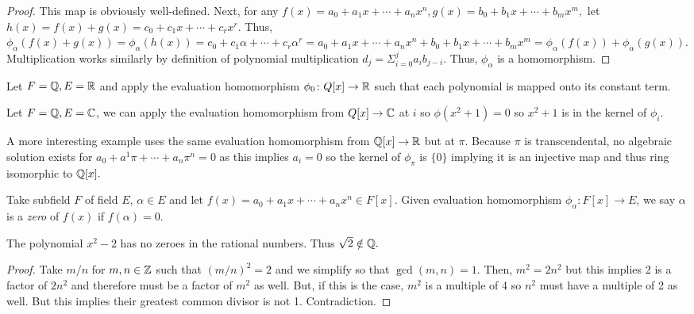 \begin{proof}
    This map is obviously well-defined. Next, for any $f(x) = a_0 + a_1x + \cdots + a_nx^n, g(x) = b_0 + b_1x + \cdots + b_mx^m,$ let $h(x) = f(x) + g(x) = c_0 + c_1x + \cdots + c_rx^r.$ Thus, $\phi_\alpha(f(x) + g(x)) = \phi_\alpha(h(x)) = c_0 + c_1\alpha + \cdots + c_r\alpha^r = a_0 + a_1x + \cdots + a_nx^n + b_0 + b_1x + \cdots + b_mx^m = \phi_\alpha(f(x)) + \phi_\alpha(g(x)).$ Multiplication works similarly by definition of polynomial multiplication $d_j = \Sigma_{i = 0}^j a_ib_{j-i}.$ Thus, $\phi_\alpha$ is a homomorphism.
\end{proof}
\begin{example}
    Let $F = \mathbb{Q}, E = \mathbb{R}$ and apply the evaluation homomorphism $\phi_0\colon Q[x] \to \mathbb{R}$ such that each polynomial is mapped onto its constant term.
\end{example}
\begin{example}
    Let $F = \mathbb{Q}, E = \mathbb{C}$, we can apply the evaluation homomorphism from $Q[x] \to \mathbb{C}$ at $i$ so $\phi(x^2 + 1) = 0$ so $x^2+1$ is in the kernel of $\phi_i.$
\end{example}
\begin{remark}
    A more interesting example uses the same evaluation homomorphism from $\mathbb{Q}[x] \to \mathbb{R}$ but at $\pi$. Because $\pi$ is transcendental, no algebraic solution exists for $a_0 + a^1\pi + \cdots + a_n\pi^n = 0$ as this implies $a_i = 0$ so the kernel of $\phi_\pi$ is $\{0\}$ implying it is an injective map and thus ring isomorphic to $\mathbb{Q}[x].$
\end{remark}
\begin{definition}[Zero of $f(x)$]
    Take subfield $F$ of field $E$, $\alpha \in E$ and let $f(x) = a_0 + a_1x + \cdots + a_nx^n \in F[x]$. Given evaluation homomorphism $\phi_\alpha\colon F[x] \to E$, we say $\alpha$ is a \emph{zero} of $f(x)$ if $f(\alpha) = 0.$
\end{definition}
\begin{theorem}
    The polynomial $x^2 - 2$ has no zeroes in the rational numbers. Thus $\sqrt{2} \notin \mathbb{Q}.$
\end{theorem}
\begin{proof}
    Take $m/n$ for $m, n \in \mathbb{Z}$ such that $(m/n)^2 = 2$ and we simplify so that $\gcd(m,n) = 1.$ Then, $m^2 = 2n^2$ but this implies 2 is a factor of $2n^2$ and therefore must be a factor of $m^2$ as well. But, if this is the case, $m^2$ is a multiple of 4 so $n^2$ must have a multiple of 2 as well. But this implies their greatest common divisor is not 1. Contradiction.
\end{proof}

